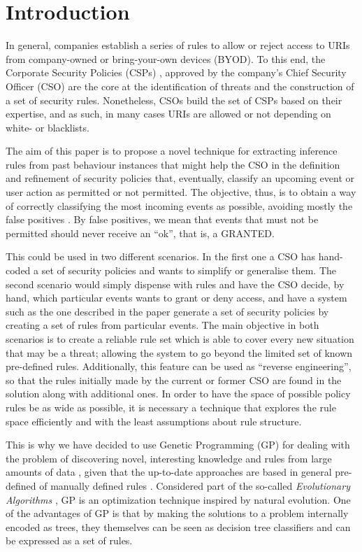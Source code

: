 \documentclass[runningheads]{llncs}
\begin{document}
\section{Introduction}
\label{sec:intro}


In general, companies establish a series of rules to allow or reject
access to URIs from company-owned or bring-your-own devices (BYOD).
To this end, the Corporate Security Policies (CSPs)
\cite{Kaeo:2003:DNS:1201807}, approved by the company's Chief Security
Officer (CSO) are the core at the identification of threats and the
construction of a set of security rules. Nonetheless, CSOs build the
set of CSPs based on their expertise, and as such, in many cases URIs
are allowed or not depending on white- or blacklists.

The aim of this paper is to propose a novel technique for extracting
inference rules from past behaviour instances 
that might help the CSO in the definition and refinement
of security policies that, eventually, classify an upcoming
event or user action as permitted or not permitted.
The objective, thus, is to obtain a way of correctly classifying the most incoming events as possible, avoiding mostly the false positives \cite{pietraszek2005data}. By false positives, we mean that events that must not be permitted should never receive an ``ok'', that is, a GRANTED. 

This could be used
in two different scenarios. In the first one a CSO has hand-coded a set of security
policies and wants to simplify or generalise them. The second scenario 
would simply dispense with rules and have the CSO decide, by hand, which
particular events wants to grant or deny access, and have a system such
as the one described in the paper generate a set of security policies
by creating a set of rules from particular events. 
The main objective in both scenarios is to create a reliable rule set
which is able to cover every new situation that may be a threat;
allowing the system to go beyond the limited set of known pre-defined
rules. Additionally, this feature can be used as ``reverse
engineering'', so that the rules initially made by the current or
former CSO are found in the solution along with additional ones. In
order to have the space of possible policy rules be as wide 
as possible, it is necessary a technique that explores the rule space
efficiently and with the least assumptions about rule structure.

This is why we have decided to use Genetic Programming (GP) for
dealing with the problem of discovering novel, interesting knowledge
and rules from large amounts of data \cite{freitas2002data}, given
that the up-to-date approaches are based in general pre-defined of
manually defined rules \cite{ali2015analysis}. Considered part of the
so-called \emph{Evolutionary Algorithms} \cite{back1996evolutionary},
GP is an optimization technique inspired by natural evolution. One of
the advantages of GP is that by making the solutions to a problem
internally encoded as trees, they themselves can be seen as decision
tree classifiers \cite{safavian1990survey} and can be expressed as a
set of rules.
\end{document}
